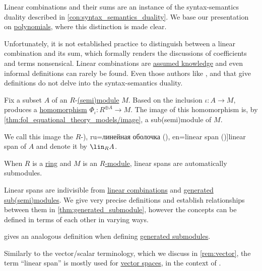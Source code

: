 \begin{comments}
  \item Linear combinations and their sums are an instance of the syntax-semantics duality described in \cref{con:syntax_semantics_duality}. We base our presentation on \hyperref[def:polynomial_algebra]{polynomials}, where this distinction is made clear.

  Unfortunately, it is not established practice to distinguish between a linear combination and its sum, which formally renders the discussions of coefficients and terms nonsensical. Linear combinations are \hyperref[con:assumed_knowledge]{assumed knowledge} and even informal definitions can rarely be found. Even those authors like \textcite[def. II.1.3]{Bourbaki1998Algebra1to3}, \textcite[153]{Golan1999Semirings} and \textcite[\S 3.2]{Тыртышников2007ЛинейнаяАлгебра} that give definitions do not delve into the syntax-semantics duality.
\end{comments}

\begin{definition}\label{def:linear_span}\mimprovised
  Fix a subset \( A \) of an \( R \)-\hyperref[def:semimodule]{(semi)module} \( M \). Based on the inclusion \( {\iota: A \to M} \),  produces a \hyperref[def:semimodule/morphism]{homomorphism} \( \Phi_\iota: R^{\oplus A} \to M \). The image of this homomorphism is, by \cref{thm:fol_equational_theory_models/image}, a sub(semi)module of \( M \).

  We call this image the \( R \)-\term[bg=линейна обвивка (\cite[118]{Обрешков1962ВисшаАлгебра}), ru=линейная оболочка (\cite[\S 3.2]{Тыртышников2007ЛинейнаяАлгебра}), en=linear span (\cite[35]{Knapp2016BasicAlgebra})]{linear span} of \( A \) and denote it by \( \lin_R A \).
\end{definition}
\begin{comments}
  \item When \( R \) is a \hyperref[def:ring]{ring} and \( M \) is an \hyperref[def:module]{\( R \)-module}, linear spans are automatically submodules.

  \item Linear spans are indivisible from \hyperref[def:linear_combination]{linear combinations} and \hyperref[def:semimodule/generated]{generated sub(semi)modules}. We give very precise definitions and establish relationships between them in \cref{thm:generated_submodule}, however the concepts can be defined in terms of each other in varying ways.

  \item \Textcite[169]{Aluffi2009Algebra} gives an analogous definition when defining \hyperref[def:module/generated]{generated submodules}.

  Similarly to the vector/scalar terminology, which we discuss in \cref{rem:vector}, the term \enquote{linear span} is mostly used for \hyperref[def:vector_space]{vector spaces}, in the context of .
\end{comments}

